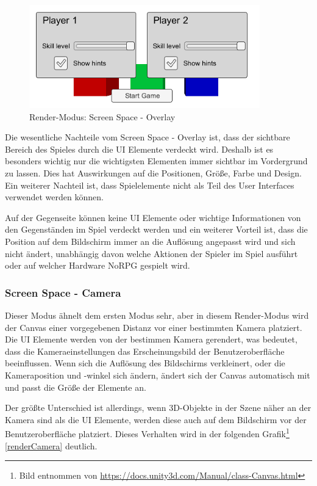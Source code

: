 			\begin{figure}[htbp]
				\centering 
				\label{renderOverlay}
				\includegraphics[width=10cm]{pics/CanvasOverlay.png}
				\caption{Render-Modus: Screen Space - Overlay}
			\end{figure}

			Die wesentliche Nachteile vom Screen Space - Overlay ist, dass der sichtbare Bereich des Spieles durch die \ac{UI} Elemente verdeckt wird. Deshalb ist es besonders wichtig nur die wichtigsten Elementen immer sichtbar im Vordergrund zu lassen. Dies hat Auswirkungen auf die Positionen, Größe, Farbe und Design. Ein weiterer Nachteil ist, dass Spielelemente nicht als Teil des User Interfaces verwendet werden können. 

			Auf der Gegenseite können keine \ac{UI} Elemente oder wichtige Informationen von den Gegenständen im Spiel verdeckt werden und ein weiterer Vorteil ist, dass die Position auf dem Bildschirm immer an die Auflösung angepasst wird und sich nicht ändert, unabhängig davon welche Aktionen der Spieler im Spiel ausführt oder auf welcher Hardware NoRPG gespielt wird.

		\subsubsection{Screen Space - Camera}
			Dieser Modus ähnelt dem ersten Modus sehr, aber in diesem Render-Modus wird der Canvas einer vorgegebenen Distanz vor einer bestimmten Kamera platziert. Die \ac{UI} Elemente werden von der bestimmen Kamera gerendert, was bedeutet, dass die Kameraeinstellungen das Erscheinungsbild der Benutzeroberfläche beeinflussen. Wenn sich die Auflösung des Bildschirms verkleinert, oder die Kameraposition und -winkel sich ändern, ändert sich der Canvas automatisch mit und passt die Größe der Elemente an.

			Der größte Unterschied ist allerdings, wenn 3D-Objekte in der Szene näher an der Kamera sind als die \ac{UI} Elemente, werden diese auch auf dem Bildschirm vor der Benutzeroberfläche platziert. Dieses Verhalten wird in der folgenden Grafik\footnote{Bild entnommen von \url{https://docs.unity3d.com/Manual/class-Canvas.html}} \ref{renderCamera} deutlich.

